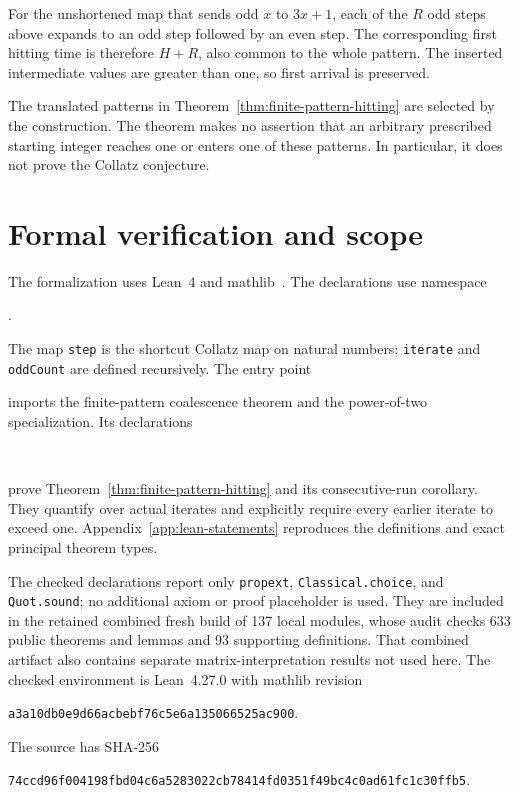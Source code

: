 \documentclass[11pt,a4paper]{article}
\newcommand{\code}[1]{\texttt{#1}}
\begin{document}
For the unshortened map that sends odd $x$ to $3x+1$, each
of the $R$ odd steps above expands to an odd step followed by an
even step. The corresponding first hitting time is therefore
$H+R$, also common to the whole pattern. The inserted intermediate
values are greater than one, so first arrival is preserved.

The translated patterns in Theorem~\ref{thm:finite-pattern-hitting}
are selected by the construction. The theorem makes no assertion
that an arbitrary prescribed starting integer reaches one or enters
one of these patterns. In particular, it does not prove the Collatz
conjecture.

\section{Formal verification and scope}
The formalization uses Lean~4 and mathlib~\cite{lean4,mathlib}.
The declarations use namespace
\begin{center}\small
{}.
\end{center}
The map \code{step} is the shortcut Collatz map on natural numbers;
\code{iterate} and \code{oddCount} are defined recursively.
The entry point
\begin{center}\small
{}
\end{center}
imports the finite-pattern coalescence theorem and the power-of-two
specialization. Its declarations
\begin{center}\small
{}\\
\end{center}
prove Theorem~\ref{thm:finite-pattern-hitting} and its consecutive-run
corollary. They quantify over actual iterates and explicitly require
every earlier iterate to exceed one. Appendix~\ref{app:lean-statements}
reproduces the definitions and exact principal theorem types.

The checked declarations report only \code{propext},
\code{Classical.choice}, and \code{Quot.sound}; no additional axiom or
proof placeholder is used. They are included in the retained combined
fresh build of 137 local modules, whose audit checks 633 public theorems
and lemmas and 93 supporting definitions. That combined artifact also
contains separate matrix-interpretation results not used here.
The checked environment is Lean~4.27.0 with mathlib revision
\begin{center}\small
\code{a3a10db0e9d66acbebf76c5e6a135066525ac900}.
\end{center}
The source  has SHA-256
\begin{center}\scriptsize
\code{74ccd96f004198fbd04c6a5283022cb78414fd0351f49bc4c0ad61fc1c30ffb5}.
\end{center}
\end{document}
